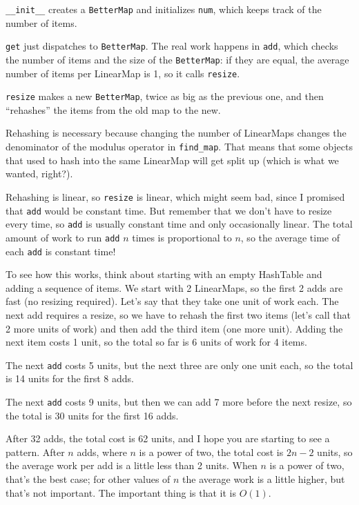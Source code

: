 \documentclass[10pt]{book}
\begin{document}
\verb"__init__" creates a {\tt BetterMap} and initializes {\tt num}, which keeps track of the number of items.

{\tt get} just dispatches to {\tt BetterMap}.  The real work happens
in {\tt add}, which checks the number of items and the size of the
{\tt BetterMap}: if they are equal, the average number of items per
LinearMap is 1, so it calls {\tt resize}.

{\tt resize} makes a new {\tt BetterMap}, twice as big as the previous
one, and then ``rehashes'' the items from the old map to the new.

Rehashing is necessary because changing the number of LinearMaps
changes the denominator of the modulus operator in
\verb"find_map".  That means that some objects that used
to hash into the same LinearMap will get split up (which is
what we wanted, right?).

Rehashing is linear, so
{\tt resize} is linear, which might seem bad, since I promised
that {\tt add} would be constant time.  But remember that
we don't have to resize every time, so {\tt add} is usually
constant time and only occasionally linear.  The total amount
of work to run {\tt add} $n$ times is proportional to $n$,
so the average time of each {\tt add} is constant time!

To see how this works, think about starting with an empty
HashTable and adding a sequence of items.  We start with 2 LinearMaps,
so the first 2 adds are fast (no resizing required).  Let's
say that they take one unit of work each.  The next add
requires a resize, so we have to rehash the first two
items (let's call that 2 more units of work) and then
add the third item (one more unit).  Adding the next item
costs 1 unit, so the total so far is
6 units of work for 4 items.

The next {\tt add} costs 5 units, but the next three
are only one unit each, so the total is 14 units for the
first 8 adds.

The next {\tt add} costs 9 units, but then we can add 7 more
before the next resize, so the total is 30 units for the
first 16 adds.

After 32 adds, the total cost is 62 units, and I hope you are starting
to see a pattern.  After $n$ adds, where $n$ is a power of two, the
total cost is $2n-2$ units, so the average work per add is
a little less than 2 units.  When $n$ is a power of two, that's
the best case; for other values of $n$ the average work is a little
higher, but that's not important.  The important thing is that it
is $O(1)$.
\end{document}
